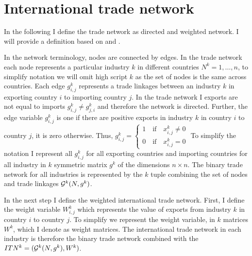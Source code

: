 \section{International trade network}
In the following I define the trade network as directed and weighted network. I will provide a definition based on \textcite{jackson2010} and \textcite{de2010}.\par 
In the network terminology, nodes are connected by edges. In the trade network each node represents a particular industry $k$ in different countries $N^k = 1, \dots , n$, to simplify notation we will omit high script $k$ as the set of nodes is the same across countries. Each edge $g_{i,j}^k $ represents a trade linkages between an industry $k$ in exporting country $i$ to importing country $j$.  In the trade network I exports are not equal to imports $g_{i,j}^k \neq g_{j,i}^k$ and therefore the network is directed. Further, the edge variable $g_{i,j}^k$ is one if there are positive exports in industry $k$ in country $i$ to country $j$, it is zero otherwise. Thus,
$g_{i,j}^k = \begin{cases}
 1 \quad \text{if} \quad x_{i,j}^k \neq 0 \\
0 \quad \text{if} \quad x_{i,j}^k = 0 \end{cases} $
To simplify the notation I represent all $g_{i,j}^k $ for all exporting countries and importing countries for all industry in $k$ symmetric
matrix $g^k$ of the dimensions $n \times n$. The binary trade network for all industries is represented by the $k$ tuple combining the set of nodes and trade linkages $\mathcal{G}^k(N, g^k)$. \par
In the next step I define the weighted international trade network. First, I define the
weight variable $W_{i,j}^k$ which represents the value of exports from industry $k$  in country $i$ to country $j$. To simplify we represent the weight variable, in $k$  matrices $W^k$, which I denote as weight matrices. %
 The international trade network in each industry is therefore the binary trade network combined with the  $ITN^k =( \mathcal{G}^k(N, g^k),W^k)$.
